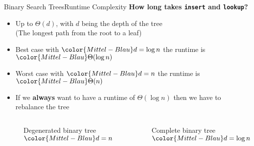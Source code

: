 
\begin{frame}{Binary Search Trees}{Runtime Complexity}
  \textbf{How long takes \texttt{\color{Mittel-Blau}insert} and
    \texttt{\color{Mittel-Blau}lookup}?}
  \begin{itemize}
    \item<2->
      Up to $\Theta(d)$, with $d$ being the
      {\color{Mittel-Blau}depth of the tree}\\
      (The longest path from the root to a leaf)
    \item<3->
      {\color{Mittel-Blau}Best case} with ${\color{Mittel-Blau}d = \log n}$
      the runtime is ${\color{Mittel-Blau}\Theta(\log n)}$
    \item<4->
      {\color{Mittel-Blau}Worst case} with ${\color{Mittel-Blau}d = n}$
      the runtime is ${\color{Mittel-Blau}\Theta(n)}$
    \item<5->
      If we \textbf{always} want to have a runtime of $\Theta(\log n)$ then
      we have to {\color{Mittel-Blau}rebalance} the tree
  \end{itemize}
  \vspace{-2.0em}
  \begin{columns}%
    \begin{column}[b]{0.4\textwidth}%
      \begin{figure}%
        \caption{Degenerated binary tree ${\color{Mittel-Blau}d = n}$}%
      \end{figure}%
    \end{column}%
    \begin{column}[b]{0.6\textwidth}%
      \begin{figure}%
        \caption{Complete binary tree ${\color{Mittel-Blau}d = \log n}$}%
        \vspace{0.85em}%
      \end{figure}%
    \end{column}%
  \end{columns}%
\end{frame}
